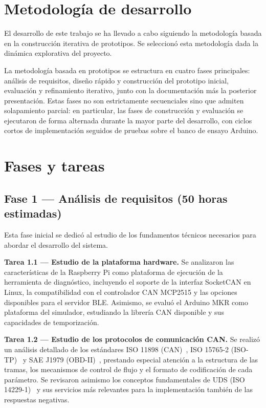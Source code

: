 \section{Metodología de desarrollo}

El desarrollo de este trabajo se ha llevado a cabo siguiendo la metodología basada en la construcción iterativa de prototipos. Se seleccionó esta metodología dada la dinámica explorativa del proyecto.

La metodología basada en prototipos se estructura en cuatro fases principales: análisis de requisitos, diseño rápido y construcción del prototipo inicial, evaluación y refinamiento iterativo, junto con la documentación más la posterior presentación. Estas fases no son estrictamente secuenciales sino que admiten solapamiento parcial: en particular, las fases de construcción y evaluación se ejecutaron de forma alternada durante la mayor parte del desarrollo, con ciclos cortos de implementación seguidos de pruebas sobre el banco de ensayo Arduino.

\section{Fases y tareas}

\subsection{Fase 1 — Análisis de requisitos \textnormal{(50 horas estimadas)}}

Esta fase inicial se dedicó al estudio de los fundamentos técnicos necesarios para abordar el desarrollo del sistema.

\textbf{Tarea 1.1 — Estudio de la plataforma hardware.} Se analizaron las características de la Raspberry Pi como plataforma de ejecución de la herramienta de diagnóstico, incluyendo el soporte de la interfaz SocketCAN en Linux, la compatibilidad con el controlador CAN MCP2515 y las opciones disponibles para el servidor BLE. Asimismo, se evaluó el Arduino MKR como plataforma del simulador, estudiando la librería CAN disponible y sus capacidades de temporización.

\textbf{Tarea 1.2 — Estudio de los protocolos de comunicación CAN.} Se realizó un análisis detallado de los estándares ISO 11898 (CAN)~\cite{ISO11898-1:2024}, ISO 15765-2 (ISO-TP)~\cite{ISO15765-2:2016} y SAE J1979 (OBD-II)~\cite{SAEJ1979:2014}, prestando especial atención a la estructura de las tramas, los mecanismos de control de flujo y el formato de codificación de cada parámetro. Se revisaron asimismo los conceptos fundamentales de UDS (ISO 14229-1)~\cite{ISO14229-1:2020} y sus servicios más relevantes para la implementación también de las respuestas negativas.

